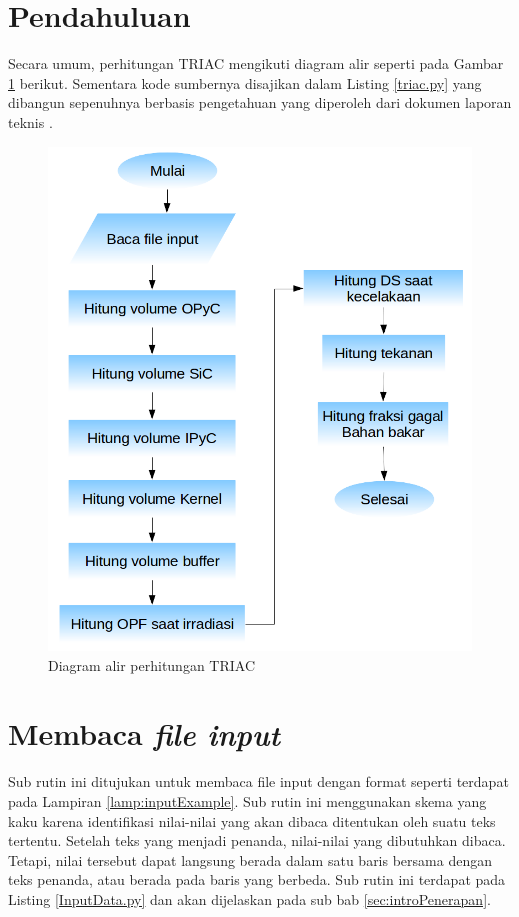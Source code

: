 \documentclass[a4paper,11pt]{report}
\begin{document}
\section{Pendahuluan}
Secara umum, perhitungan TRIAC mengikuti diagram alir seperti pada Gambar \ref{fig:flowchart} berikut. Sementara kode sumbernya disajikan dalam Listing \ref{triac.py} yang dibangun sepenuhnya berbasis pengetahuan yang diperoleh dari dokumen laporan teknis \cite{report1}.
\begin{figure}[h]
  \centering
  \includegraphics[scale=.5]{pics/Flowchart.png}
  \caption{Diagram alir perhitungan TRIAC}
  \label{fig:flowchart}
\end{figure}

\section{Membaca \textit{file input}}
Sub rutin ini ditujukan untuk membaca file input dengan format seperti terdapat pada Lampiran \ref{lamp:inputExample}. Sub rutin ini menggunakan skema yang kaku karena identifikasi nilai-nilai yang akan dibaca ditentukan oleh suatu teks tertentu. Setelah teks yang menjadi penanda, nilai-nilai yang dibutuhkan dibaca. Tetapi, nilai tersebut dapat langsung berada dalam satu baris bersama dengan teks penanda, atau berada pada baris yang berbeda. Sub rutin ini terdapat pada Listing \ref{InputData.py} dan akan dijelaskan pada sub bab \ref{sec:introPenerapan}.
 
\end{document}
